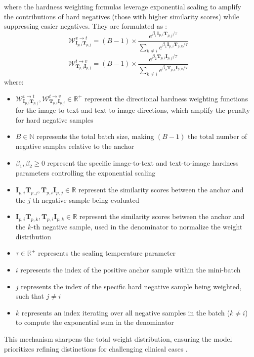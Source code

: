 where the hardness weighting formulas leverage exponential scaling to amplify the contributions of hard negatives (those with higher similarity scores) while suppressing easier negatives. They are formulated as \cite{medclipsam}:
\begin{equation}
\mathcal{W}_{\mathbf{I}_{p,i}\mathbf{T}_{p,j}}^{v \rightarrow t} = (B - 1) \times \frac{e^{\beta_1 \mathbf{I}_{p,i}\mathbf{T}_{p,j} / \tau}}{\sum_{k \neq i} e^{\beta_1 \mathbf{I}_{p,i}\mathbf{T}_{p,k} / \tau}}
\end{equation}
\begin{equation}
\mathcal{W}_{\mathbf{T}_{p,i}\mathbf{I}_{p,j}}^{t \rightarrow v} = (B - 1) \times \frac{e^{\beta_2 \mathbf{T}_{p,i}\mathbf{I}_{p,j} / \tau}}{\sum_{k \neq i} e^{\beta_2 \mathbf{T}_{p,i}\mathbf{I}_{p,k} / \tau}}
\end{equation}
where:
\begin{itemize}
\item $\mathcal{W}_{\mathbf{I}_{p,i}\mathbf{T}_{p,j}}^{v \rightarrow t}, \mathcal{W}_{\mathbf{T}_{p,i}\mathbf{I}_{p,j}}^{t \rightarrow v} \in \mathbb{R}^+$ represent the directional hardness weighting functions for the image-to-text and text-to-image directions, which amplify the penalty for hard negative samples
\item $B \in \mathbb{N}$ represents the total batch size, making $(B - 1)$ the total number of negative samples relative to the anchor
\item $\beta_1, \beta_2 \ge 0$ represent the specific image-to-text and text-to-image hardness parameters controlling the exponential scaling
\item $\mathbf{I}_{p,i}\mathbf{T}_{p,j}, \mathbf{T}_{p,i}\mathbf{I}_{p,j} \in \mathbb{R}$ represent the similarity scores between the anchor and the $j$-th negative sample being evaluated
\item $\mathbf{I}_{p,i}\mathbf{T}_{p,k}, \mathbf{T}_{p,i}\mathbf{I}_{p,k} \in \mathbb{R}$ represent the similarity scores between the anchor and the $k$-th negative sample, used in the denominator to normalize the weight distribution
\item $\tau \in \mathbb{R}^+$ represents the scaling temperature parameter
\item $i$ represents the index of the positive anchor sample within the mini-batch
\item $j$ represents the index of the specific hard negative sample being weighted, such that $j \neq i$
\item $k$ represents an index iterating over all negative samples in the batch ($k \neq i$) to compute the exponential sum in the denominator
\end{itemize}
This mechanism sharpens the total weight distribution, ensuring the model prioritizes refining distinctions for challenging clinical cases \cite{medclipsam}.

